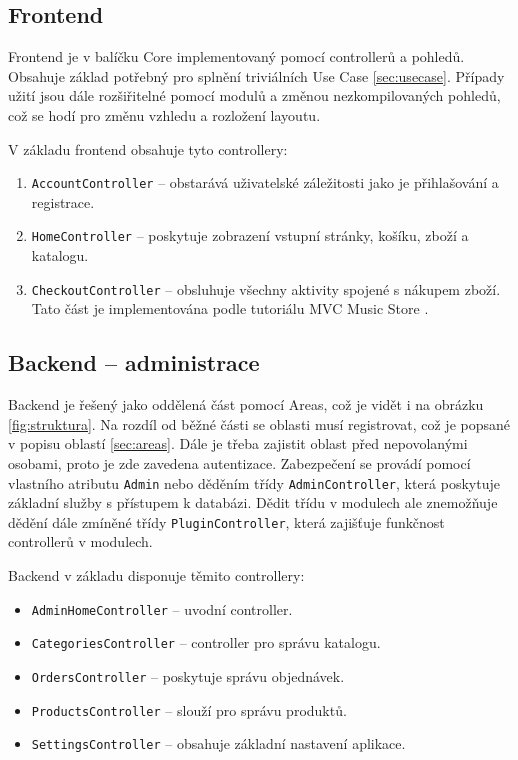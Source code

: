 \documentclass[11pt,twoside,a4paper]{book}
\begin{document}
\subsection{Frontend}

Frontend je v balíčku Core implementovaný pomocí controllerů a pohledů. Obsahuje základ potřebný pro splnění triviálních Use Case \ref{sec:usecase}. Případy užití jsou dále rozšiřitelné pomocí modulů a změnou nezkompilovaných pohledů, což se hodí pro změnu vzhledu a rozložení layoutu.

V základu frontend obsahuje tyto controllery:

\begin{enumerate}
\item \texttt{AccountController} -- obstarává uživatelské záležitosti jako je přihlašování a registrace.
\item \texttt{HomeController} -- poskytuje zobrazení vstupní stránky, košíku, zboží a katalogu.
\item \texttt{CheckoutController} -- obsluhuje všechny aktivity spojené s nákupem zboží. Tato část je implementována podle tutoriálu MVC Music Store \cite{musicstore}. 
\end{enumerate}

\subsection{Backend -- administrace}

Backend je řešený jako oddělená část pomocí \textsf{Areas}, což je vidět i na obrázku \ref{fig:struktura}. Na rozdíl od běžné části se oblasti musí registrovat, což je popsané v popisu oblastí \ref{sec:areas}. Dále je třeba zajistit oblast před nepovolanými osobami, proto je zde zavedena autentizace. Zabezpečení se provádí pomocí vlastního atributu \texttt{Admin} nebo děděním třídy \texttt{AdminController}, která poskytuje základní služby s přístupem k databázi. Dědit třídu v modulech ale znemožňuje dědění dále zmíněné třídy \texttt{PluginController}, která zajišťuje funkčnost controllerů v modulech.

Backend v základu disponuje těmito controllery:

\begin{itemize}
\item \texttt{AdminHomeController} -- uvodní controller.
\item \texttt{CategoriesController} -- controller pro správu katalogu.
\item \texttt{OrdersController} -- poskytuje správu objednávek.
\item \texttt{ProductsController} -- slouží pro správu produktů.
\item \texttt{SettingsController} -- obsahuje základní nastavení aplikace.
\end{itemize}
\end{document}
